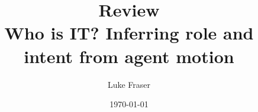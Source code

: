 \documentclass{article}
\begin{document}
\title{{\large Review} \\ Who is IT? Inferring role and intent from agent motion}
\author{Luke Fraser}
\date{\today}
\maketitle

\begingroup
\renewcommand{\section}[2]{}


\endgroup

\section*{Summary}

\section*{Strengths}

\section*{Critique}

\cite{4354065}
\end{document}
